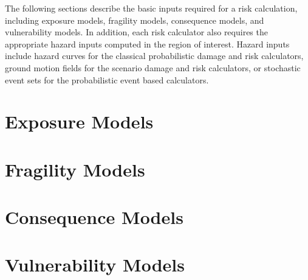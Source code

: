 The following sections describe the basic inputs required for a risk
calculation, including exposure models, fragility models, consequence models,
and vulnerability models. In addition, each risk calculator also requires the
appropriate hazard inputs computed in the region of interest. Hazard inputs
include hazard curves for the classical probabilistic damage and risk
calculators, ground motion fields for the scenario damage and risk
calculators, or stochastic event sets for the probabilistic event based
calculators.


\section{Exposure Models}
\label{sec:exposure}


\section{Fragility Models}
\label{sec:fragility}


\section{Consequence Models}
\label{sec:consequence}


\section{Vulnerability Models}
\label{sec:vulnerability}

